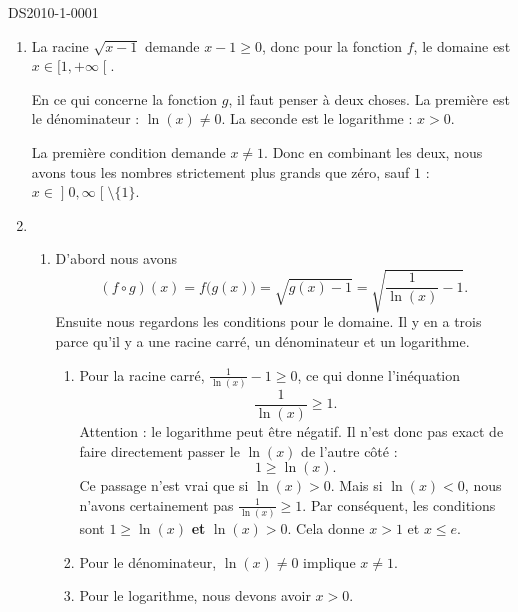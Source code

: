 
\begin{corrige}{DS2010-1-0001}

	\begin{enumerate}
		\item
			La racine $\sqrt{x-1}$ demande $x-1\geq 0$, donc pour la fonction $f$, le domaine est $x\in\mathopen[ 1, +\infty  \mathclose[$.

			En ce qui concerne la fonction $g$, il faut penser à deux choses. La première est le dénominateur : $\ln(x)\neq 0$. La seconde est le logarithme : $x>0$.

			La première condition demande $x\neq 1$. Donc en combinant les deux, nous avons tous les nombres strictement plus grands que zéro, sauf $1$ : $x\in\mathopen] 0 , \infty \mathclose[\setminus\{ 1 \}$.

		\item
			\begin{enumerate}
				\item
					D'abord nous avons
					\begin{equation}
						(f\circ g)(x)=f\big( g(x) \big)=\sqrt{g(x)-1}=\sqrt{\frac{1}{ \ln(x) }-1}.
					\end{equation}
					Ensuite nous regardons les conditions pour le domaine. Il y en a trois parce qu'il y a une racine carré, un dénominateur et un logarithme.
					\begin{enumerate}
						\item
							Pour la racine carré, $\frac{1}{ \ln(x) }-1\geq 0$, ce qui donne l'inéquation
							\begin{equation}
								\frac{1}{ \ln(x) }\geq 1.
							\end{equation}
							Attention : le logarithme peut être négatif. Il n'est donc pas exact de faire directement passer le $\ln(x)$ de l'autre côté :
							\begin{equation}
								1\geq\ln(x).
							\end{equation}
							Ce passage n'est vrai que si $\ln(x)>0$. Mais si $\ln(x)<0$, nous n'avons certainement pas $\frac{1}{ \ln(x) }\geq 1$. Par conséquent, les conditions sont $1\geq\ln(x)$ {\bf et} $\ln(x)>0$. Cela donne $x>1$ et $x\leq e$.
						\item
							Pour le dénominateur, $\ln(x)\neq 0$ implique $x\neq 1$.
						\item
							Pour le logarithme, nous devons avoir $x>0$.


\end{enumerate}
\end{enumerate}
\end{enumerate}
\end{corrige}
